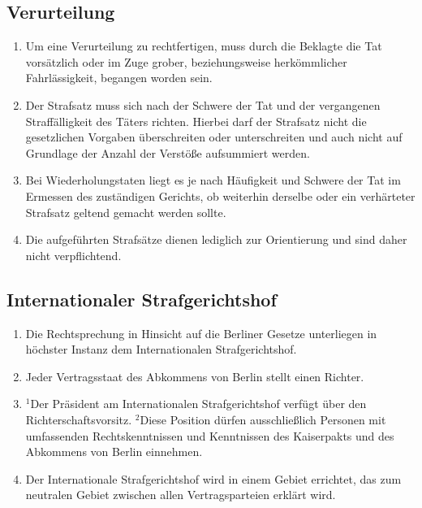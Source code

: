 \documentclass{article}
\begin{document}
\subsection{Verurteilung}
\begin{enumerate}[(1)]
    \item Um eine Verurteilung zu rechtfertigen, muss durch die Beklagte die Tat vorsätzlich oder im Zuge grober, beziehungsweise herkömmlicher Fahrlässigkeit, begangen worden sein.
    \item Der Strafsatz muss sich nach der Schwere der Tat und der vergangenen Straffälligkeit des Täters richten. Hierbei darf der Strafsatz nicht die gesetzlichen Vorgaben überschreiten oder unterschreiten und auch nicht auf Grundlage der Anzahl der Verstöße aufsummiert werden.
    \item Bei Wiederholungstaten liegt es je nach Häufigkeit und Schwere der Tat im Ermessen des zuständigen Gerichts, ob weiterhin derselbe oder ein verhärteter Strafsatz geltend gemacht werden sollte.
    \item Die aufgeführten Strafsätze dienen lediglich zur Orientierung und sind daher nicht verpflichtend.
\end{enumerate}

\subsection{Internationaler Strafgerichtshof}
\begin{enumerate}[(1)]
    \item Die Rechtsprechung in Hinsicht auf die Berliner Gesetze unterliegen in höchster Instanz dem Internationalen Strafgerichtshof.
    \item Jeder Vertragsstaat des Abkommens von Berlin stellt einen Richter.
    \item ${^1}$Der Präsident am Internationalen Strafgerichtshof verfügt über den Richterschaftsvorsitz. ${^2}$Diese Position dürfen ausschließlich Personen mit umfassenden Rechtskenntnissen und Kenntnissen des Kaiserpakts und des Abkommens von Berlin einnehmen.
    \item Der Internationale Strafgerichtshof wird in einem Gebiet errichtet, das zum neutralen Gebiet zwischen allen Vertragsparteien erklärt wird.
\end{enumerate}
\end{document}
